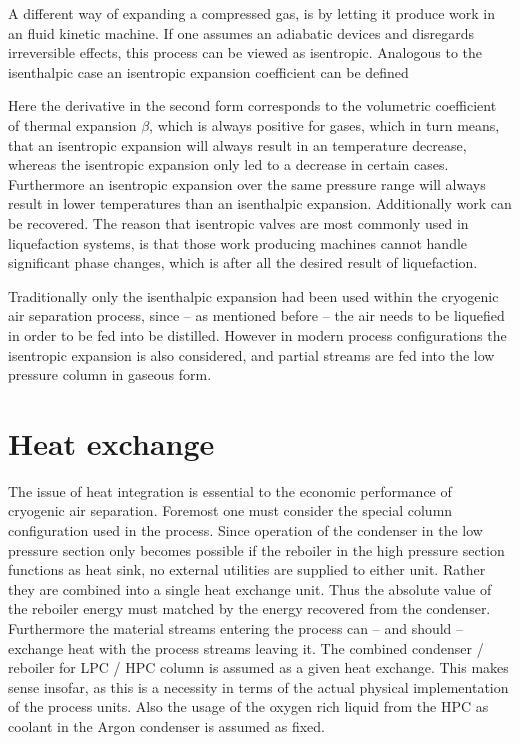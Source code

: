         A different way of expanding a compressed gas, is by letting it produce work in an fluid kinetic machine.
        If one assumes an adiabatic devices and disregards irreversible effects, this process can be viewed as
        isentropic. Analogous to the isenthalpic case an isentropic expansion coefficient can be defined

        Here the derivative in the second form corresponds to the volumetric coefficient of thermal expansion
        $\beta$, which is always positive for gases, which in turn means, that an isentropic expansion
        will always result in an temperature decrease, whereas the isentropic expansion only led to a decrease in
        certain cases. Furthermore an isentropic expansion over the same pressure range will always result in
        lower temperatures than an isenthalpic expansion. Additionally work can be recovered. The reason
        that isentropic valves are most commonly used in liquefaction systems, is that those work producing
        machines cannot handle significant phase changes, which is after all the desired result of liquefaction.

        Traditionally only the isenthalpic expansion had been used within the cryogenic air separation process,
        since -- as mentioned before -- the air needs to be liquefied in order to be fed into be distilled. However
        in modern process configurations the isentropic expansion is also considered, and partial streams are fed into
        the low pressure column in gaseous form.


\section{Heat exchange}
\label{sec:heat_exchange}
    The issue of heat integration is essential to the economic performance of cryogenic air separation. Foremost
    one must consider the special column configuration used in the process. Since operation of the condenser in the
    low pressure section only becomes possible if the reboiler in the high pressure section functions as heat sink,
    no external utilities are supplied to either unit. Rather they are combined into a single heat exchange unit. Thus
    the absolute value of the reboiler energy must matched by the energy recovered from the condenser. Furthermore
    the material streams entering the process can -- and should -- exchange heat with the process streams leaving it.
    The combined condenser / reboiler for LPC / HPC column is assumed as a given heat exchange. This makes sense insofar,
    as this is a necessity in terms of the actual physical implementation of the process units. Also the usage of the
    oxygen rich liquid from the HPC as coolant in the Argon condenser is assumed as fixed.

